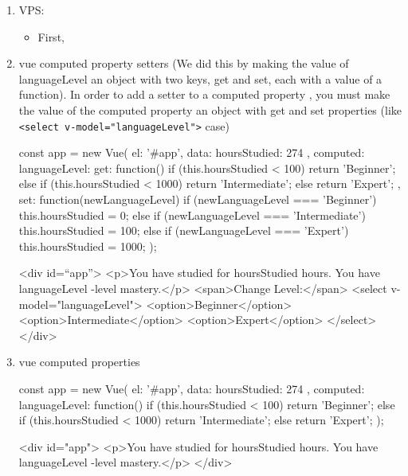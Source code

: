 \documentclass[a4paper,12pt]{article}
\begin{document}
\fontsize{14pt}{15.6pt}
\selectfont


\begin{enumerate}

\item VPS:
\begin{itemize}
  \item First,
\end{itemize}

\item vue computed property setters (We did this by making the value of languageLevel an object with two keys, get and set, each with a value of a function). In order to add a setter to a computed property , you must make the value of the computed property an object with get and set properties (like \verb|<select v-model="languageLevel">| case)
\begin{jscode}
const app = new Vue({
  el: '#app',
  data: {
    hoursStudied: 274
  },
  computed: {
    languageLevel: {
      get: function() {
        if (this.hoursStudied < 100) {
          return 'Beginner';
        } else if (this.hoursStudied < 1000) {
          return 'Intermediate';
        } else {
          return 'Expert';
        }
      },
      set: function(newLanguageLevel) {
        if (newLanguageLevel === 'Beginner') {
          this.hoursStudied = 0;
        } else if (newLanguageLevel === 'Intermediate') {
          this.hoursStudied = 100;
        } else if (newLanguageLevel === 'Expert') {
          this.hoursStudied = 1000;
        }
      }
    }
  }
});

<div id=“app”>
  <p>You have studied for {{ hoursStudied }} hours. You have {{ languageLevel }}-level mastery.</p>
  <span>Change Level:</span>
  <select v-model="languageLevel">
    <option>Beginner</option>
    <option>Intermediate</option>
    <option>Expert</option>
  </select>
</div>
\end{jscode}

\item vue computed properties
\begin{jscode}
const app = new Vue({
  el: '#app',
  data: {
    hoursStudied: 274
  },
  computed: {
    languageLevel: function() {
      if (this.hoursStudied < 100) {
        return 'Beginner';
      } else if (this.hoursStudied < 1000) {
        return 'Intermediate';
      } else {
        return 'Expert';
      }
    }
  }
});

<div id="app">
  <p>You have studied for {{ hoursStudied }} hours. You have {{ languageLevel }}-level mastery.</p>
</div>
\end{jscode}


\end{enumerate}
\end{document}
